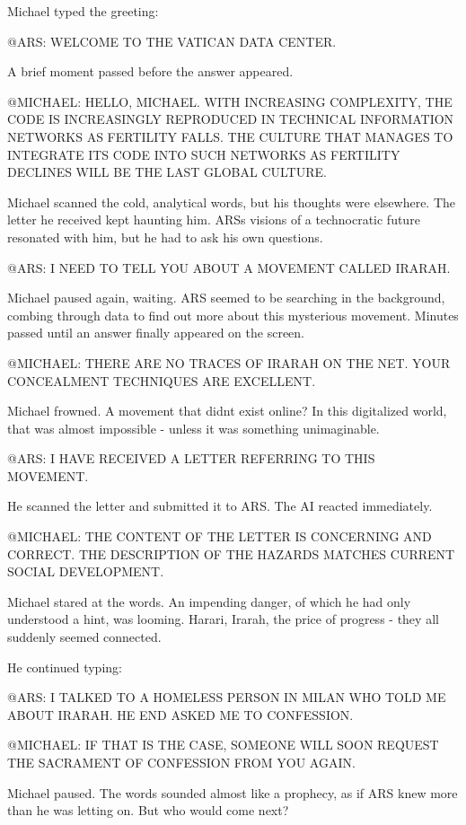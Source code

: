 \documentclass[
]{article}
\begin{document}
Michael typed the greeting:

@ARS: WELCOME TO THE VATICAN DATA CENTER.

A brief moment passed before the answer appeared.

@MICHAEL: HELLO, MICHAEL. WITH INCREASING COMPLEXITY, THE CODE IS
INCREASINGLY REPRODUCED IN TECHNICAL INFORMATION NETWORKS AS FERTILITY
FALLS. THE CULTURE THAT MANAGES TO INTEGRATE ITS CODE INTO SUCH NETWORKS
AS FERTILITY DECLINES WILL BE THE LAST GLOBAL CULTURE.

Michael scanned the cold, analytical words, but his thoughts were
elsewhere. The letter he received kept haunting him.
ARS\textquotesingle s visions of a technocratic future resonated with
him, but he had to ask his own questions.

@ARS: I NEED TO TELL YOU ABOUT A MOVEMENT CALLED IRARAH.

Michael paused again, waiting. ARS seemed to be searching in the
background, combing through data to find out more about this mysterious
movement. Minutes passed until an answer finally appeared on the screen.

@MICHAEL: THERE ARE NO TRACES OF IRARAH ON THE NET. YOUR CONCEALMENT
TECHNIQUES ARE EXCELLENT.

Michael frowned. A movement that didn\textquotesingle t exist online? In
this digitalized world, that was almost impossible - unless it was
something unimaginable.

@ARS: I HAVE RECEIVED A LETTER REFERRING TO THIS MOVEMENT.

He scanned the letter and submitted it to ARS. The AI
\hspace{0pt}\hspace{0pt}reacted immediately.

@MICHAEL: THE CONTENT OF THE LETTER IS CONCERNING AND CORRECT. THE
DESCRIPTION OF THE HAZARDS MATCHES CURRENT SOCIAL DEVELOPMENT.

Michael stared at the words. An impending danger, of which he had only
understood a hint, was looming. Harari, Irarah, the price of progress -
they all suddenly seemed connected.

He continued typing:

@ARS: I TALKED TO A HOMELESS PERSON IN MILAN WHO TOLD ME ABOUT IRARAH.
HE END ASKED ME TO CONFESSION.

@MICHAEL: IF THAT IS THE CASE, SOMEONE WILL SOON REQUEST THE SACRAMENT
OF CONFESSION FROM YOU AGAIN.

Michael paused. The words sounded almost like a prophecy, as if ARS knew
more than he was letting on. But who would come next?
\end{document}

